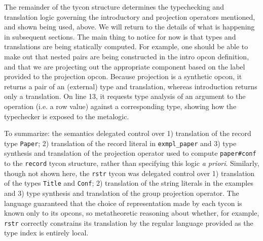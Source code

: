 \documentclass[preprint]{sigplanconf}
\newcommand{\liv}[1]{\lstinline{#1}}
\begin{document}
The remainder of the tycon structure determines the typechecking and translation logic governing the introductory and projection operators mentioned, and shown being used, above. We will return to the details of what is happening in subsequent sections. The main thing to notice for now is that types and translations are being statically computed. For example, one should be able to make out that nested pairs are being constructed in the intro opcon definition, and that we are projecting out the appropriate component based on the label provided to the projection opcon. Because projection is a synthetic opcon, it returns a pair of an (external) type and translation, whereas introduction returns only a translation. On line 13, it requests type analysis of an argument to the operation (i.e. a row value) against a corresponding type, showing how the typechecker is  exposed to the metalogic.


To summarize: the semantics delegated control over 1) translation of the record type \liv{Paper}; 2) translation of the record literal in \liv{exmpl_paper} and 3) type synthesis and translation of the projection operator used to compute \liv{paper#conf} to the \liv{record} tycon structure, rather than specifying this logic \emph{a priori}. Similarly, though not shown here, the \liv{rstr} tycon was delegated control over 1) translation of the types \liv{Title} and \liv{Conf}; 2) translation of the string literals in the examples and 3) type synthesis and translation of the group projection operator. The language guaranteed that the choice of representation made by each tycon is known only to its opcons, so metatheoretic reasoning about whether, for example, \liv{rstr} correctly constrains its translation by the regular language provided as the type index is entirely local.


\end{document}
